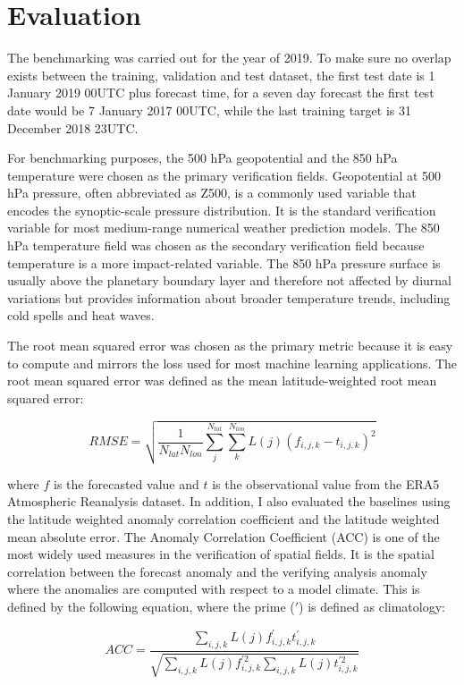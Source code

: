 \section{Evaluation}
The benchmarking was carried out for the year of 2019. To make sure no overlap exists between the training, validation and test dataset, the first test date is 1 January 2019 00UTC plus forecast time, for a seven day forecast the first test date would be 7 January 2017 00UTC, while the last training target is 31 December 2018 23UTC. 

For benchmarking purposes, the 500 hPa geopotential and the 850 hPa temperature were chosen as the primary verification fields. Geopotential at 500 hPa pressure, often abbreviated as Z500, is a commonly used variable that encodes the synoptic-scale pressure distribution. It is the standard verification variable for most medium-range numerical weather prediction models. The 850 hPa temperature field was chosen as the secondary verification field because temperature is a more impact-related variable. The 850 hPa pressure surface is usually above the planetary boundary layer and therefore not affected by diurnal variations but provides information about broader temperature trends, including cold spells and heat waves. 

The root mean squared error was chosen as the primary metric because it is easy to compute and mirrors the loss used for most machine learning applications. The root mean squared error was defined as the mean latitude-weighted root mean squared error:

\begin{equation}
    RMSE = \sqrt{\frac{1}{N_{lat} N_{lon}} \sum_{j}^{N_{lat}} \sum_{k}^{N_{lon}} L(j) (f_{i, j, k} - t_{i, j, k})^2}
\end{equation}

where $f$ is the forecasted value and $t$ is the observational value from the ERA5 Atmospheric Reanalysis dataset. In addition, I also evaluated the baselines using the latitude weighted anomaly correlation coefficient and the latitude weighted mean absolute error. The Anomaly Correlation Coefficient (ACC) is one of the most widely used measures in the verification of spatial fields. It is the spatial correlation between the forecast anomaly and the verifying analysis anomaly where the anomalies are computed with respect to a model climate. This is defined by the following equation, where the prime ($\prime$) is defined as climatology:

\begin{equation}
    ACC = \frac{\sum_{i, j, k} L(j) f^{\prime}_{i, j, k} t^{\prime}_{i, j, k}}{\sqrt{\sum_{i, j, k} L(j) f^{\prime 2}_{i, j, k} \sum_{i, j, k} L(j) t^{\prime 2}_{i, j, k}}}
\end{equation}
